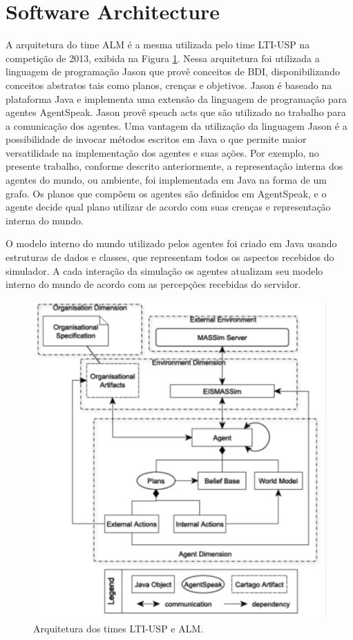 \documentclass{llncs}
\begin{document}
\section{Software Architecture}

A arquitetura do time ALM é a mesma utilizada pelo time LTI-USP na competição de 2013, exibida na Figura \ref{fig:fig1}. Nessa arquitetura foi utilizada a linguagem de programação Jason que provê conceitos de BDI, disponibilizando conceitos abstratos tais como planos, crenças e objetivos. Jason é baseado na plataforma Java e implementa uma extensão da linguagem de programação para agentes AgentSpeak. Jason provê speach acts que são utilizado no trabalho para a comunicação dos agentes. Uma vantagem da utilização da linguagem Jason é a possibilidade de invocar métodos escritos em Java o que permite maior versatilidade na implementação dos agentes e suas ações. Por exemplo, no presente trabalho, conforme descrito anteriormente, a representação interna dos agentes do mundo, ou ambiente, foi implementada em Java na forma de um grafo. Os planos que compõem os agentes são definidos em AgentSpeak, e o agente decide qual plano utilizar de acordo com suas crenças e representação interna do mundo.

O modelo interno do mundo utilizado pelos agentes foi criado em Java usando estruturas de dados e classes, que representam todos os aspectos recebidos do simulador. A cada interação da simulação os agentes atualizam seu modelo interno do mundo de acordo com as percepções recebidas do servidor.


\begin{figure}[!h]
\centering
\includegraphics[width=0.7\linewidth]{./Img/fig1.png}
\caption{Arquitetura dos times LTI-USP e ALM.}
\label{fig:fig1}
\end{figure}
\end{document}
